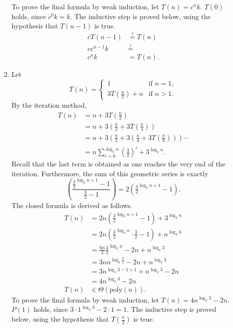 \documentclass[12pt]{article}
\begin{document}
\begin{enumerate}
\begin{enumerate}
        To prove the final formula by weak induction, let $T(n) = c^{n} k$. $T(0)$ holds, since $c^{0} k = k$. The inductive step is proved below, using the hypothesis that $T(n - 1)$ is true.
        \begin{align*}
            cT(n - 1) &\stackrel{?}{=} T(n) \\
            c c^{n - 1} k &\stackrel{?}{=} \\
            c^{n} k &= T(n). 
        \end{align*}
        \item\label{ex:4d} Let \[
            T(n) = \begin{cases}
                1 &\text{if } n = 1, \\
                3T(\frac{n}{2}) + n &\text{if } n > 1.
            \end{cases}
        \] By the iteration method,
        \begin{align*}
            T(n) &= n + 3T(\tfrac{n}{2}) \\
            &= n + 3(\tfrac{n}{2} + 3T(\tfrac{n}{4})) \\ 
            &= n + 3(\tfrac{n}{2} + 3(\tfrac{n}{4} + 3T(\tfrac{n}{8}))) \cdots \\
            &= n\sum_{i = 0}^{\log_{2} n} (\tfrac{3}{2})^{i} + 3^{\log_{2} n}.
        \end{align*}
        Recall that the last term is obtained as one reaches the very end of the iteration. Furthermore, the sum of this geometric series is exactly \[\left(\frac{\frac{3}{2}^{\log_{2} n + 1} - 1}{\frac{3}{2} - 1}\right) = 2(\tfrac{3}{2}^{\log_{2} n + 1} - 1).\]
        The closed formula is derived as follows.
        \begin{align*}
            T(n) &= 2n(\tfrac{3}{2}^{\log_{2} n + 1} - 1) + 3^{\log_{2} n} \\
            &= 2n(\tfrac{3}{2}^{\log_{2} n} \cdot \tfrac{3}{2} - 1) + n^{\log_{2} 3} \\
            &= \tfrac{6n}{2}\tfrac{3}{2}^{\log_{2} n} - 2n + n^{\log_{2} 3} \\
            &= 3nn^{\log_{2} \tfrac{3}{2}} - 2n + n^{\log_{2} 3} \\
            &= 3n^{\log_{2} 3 - 1 + 1} + n^{\log_{2} 3} - 2n \\
            &= 4n^{\log_{2} 3} - 2n \\
            T(n) &\in \Theta(\text{poly}(n)).
        \end{align*}
        To prove the final formula by weak induction, let $T(n) = 4n^{\log_{2} 3} - 2n$. $P(1)$ holds, since $3 \cdot 1^{\log_{2} 3} - 2 \cdot 1 = 1$. The inductive step is proved below, using the hypothesis that $T(\frac{n}{2})$ is true.

\end{enumerate}
\end{enumerate}
\end{document}
